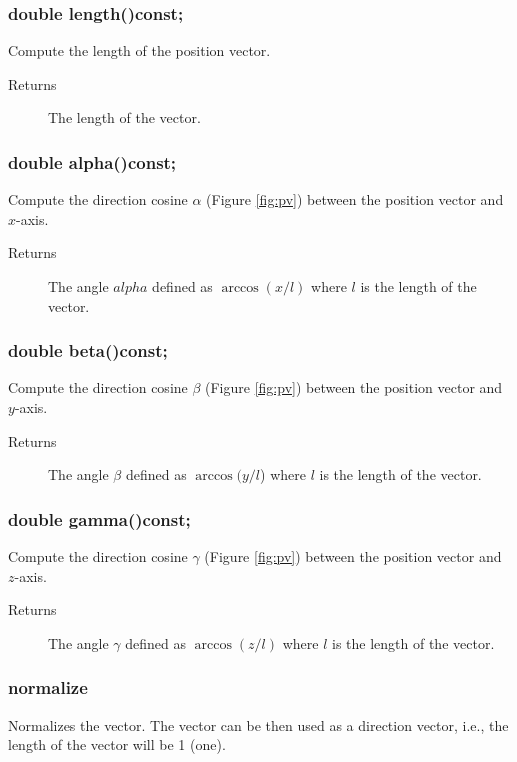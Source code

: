 \subsubsection{double length()const;}
 Compute the length of the position vector.
   \begin{description}
       \item [Returns] The length of the vector.
   \end{description} 

\subsubsection{double alpha()const;} 
Compute the direction cosine $\alpha$ (Figure \ref{fig:pv}) between the position 
vector and $x$-axis.
  \begin{description}
       \item [Returns] The angle $alpha$  defined as $\arccos (x / l)$
                       where $l$ is the length of the vector.
   
  \end{description} 

\subsubsection{double beta()const;} 
Compute the direction cosine $\beta$ (Figure \ref{fig:pv}) between the position 
vector and $y$-axis.
  \begin{description}
       \item [Returns] The angle $\beta$  defined as $\arccos (y / l$)
                       where $l$ is the length of the vector. 
  \end{description} 

\subsubsection{double gamma()const;}
Compute the direction cosine $\gamma$ (Figure \ref{fig:pv}) between the position 
vector and $z$-axis.
  \begin{description}
       \item [Returns] The angle $\gamma$ defined as $\arccos (z / l)$
                       where $l$ is the length of the vector.
  \end{description} 

\subsubsection{normalize}
Normalizes the vector. The vector can be then used as a direction
vector, i.e., the length of the vector will be 1 (one).
 
